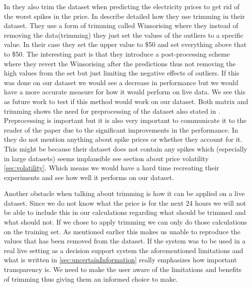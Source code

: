 In \cite{singhal2011electricity, yamin2004adaptive} they also trim the dataset when predicting the electricity prices to get rid of the worst spikes in the price. In \cite{yamin2004adaptive} describe detailed how they use trimming in their dataset. They use a form of trimming called Winsorising\cite{Winsorising} where they instead of removing the data(trimming) they just set the values of the outliers to a specific value. In their case they set the upper value to \$50 and set everything above that to \$50. The interesting part is that they introduce a post-processing scheme where they revert the Winsorising after the predictions thus not removing the high values from the set but just limiting the negative effects of outliers. If this was done on our dataset we would see a decrease in performance\cite{yamin2004adaptive} but we would have a more accurate measure for how it would perform on live data. We see this as future work to test if this method would work on our dataset. Both matrix and trimming shows the need for preprocessing of the dataset also stated in \cite{yamin2004adaptive}. Preprocessing is important but it is also very important to communicate it to the reader of the paper due to the significant improvements in the performance. In \cite{sansom1999neural, 1} they do not mention anything about spike prices or whether they account for it. This might be because their dataset does not contain any spikes which (especially in large datasets) seems implausible see section about price volatility \ref{sec:volatility}. Which means we would have a hard time recreating their experiments and see how well it performs on our dataset.

Another obstacle when talking about trimming is how it can be applied on a live dataset. Since we do not know what the price is for the next 24 hours we will not be able to include this in our calculations regarding what should be trimmed and what should not. If we chose to apply trimming we can only do those calculations on the training set. As mentioned earlier this makes us unable to reproduce the values that has been removed from the dataset. If the system was to be used in a real live setting as a decision support system the aforementioned limitations and what is written in \ref{sec:uncertainInformation} really emphasizes how important transparency is. We need to make the user aware of the limitations and benefits of trimming thus giving them an informed choice to make.

